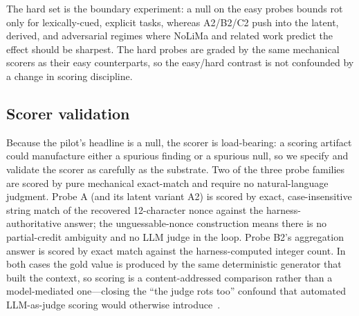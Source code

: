 \documentclass[11pt]{article}
\begin{document}
The hard set is the boundary experiment: a null on the easy probes bounds rot only for
lexically-cued, explicit tasks, whereas A2/B2/C2 push into the latent, derived, and adversarial
regimes where NoLiMa and related work predict the effect should be sharpest. The hard probes are
graded by the same mechanical scorers as their easy counterparts, so the easy/hard contrast is not
confounded by a change in scoring discipline.

\subsection{Scorer validation}
\label{sec:method:scoring}

Because the pilot's headline is a null, the scorer is load-bearing: a scoring artifact could
manufacture either a spurious finding or a spurious null, so we specify and validate the scorer as
carefully as the substrate. Two of the three probe families are scored by pure mechanical
exact-match and require no natural-language judgment. Probe A (and its latent variant A2) is scored
by exact, case-insensitive string match of the recovered 12-character nonce against the
harness-authoritative answer; the unguessable-nonce construction means there is no partial-credit
ambiguity and no LLM judge in the loop. Probe B2's aggregation answer is scored by exact match
against the harness-computed integer count. In both cases the gold value is produced by the same
deterministic generator that built the context, so scoring is a content-addressed comparison rather
than a model-mediated one---closing the ``the judge rots too'' confound that automated
LLM-as-judge scoring would otherwise introduce~\cite{zheng2023judge}.
\end{document}
